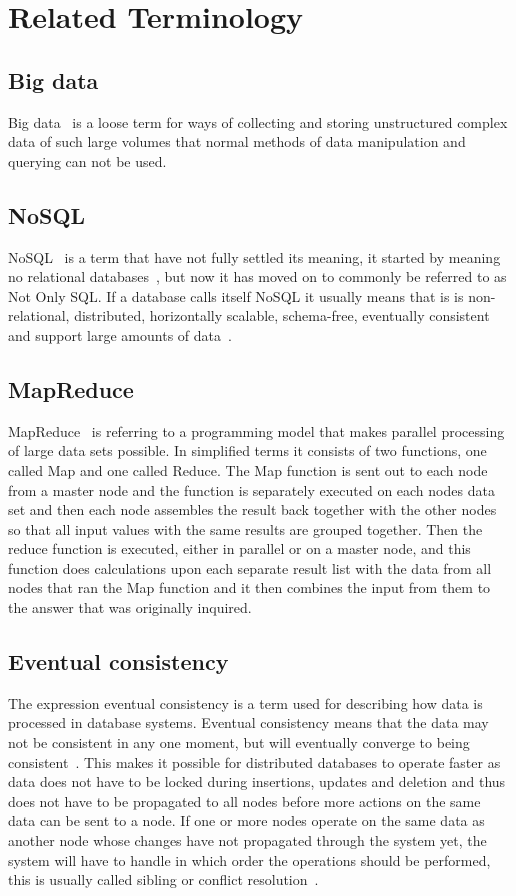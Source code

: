 \documentclass[a4paper,12pt]{article}
\begin{document}
\newpage
\section{Related Terminology}

\subsection{Big data}
Big data~\cite{BD1} is a loose term for ways of collecting and storing unstructured complex data of such large volumes that normal methods of data manipulation and querying can not be used.

\subsection{NoSQL}
NoSQL~\cite{NOSQL} is a term that have not fully settled its meaning, it started by meaning no relational databases~\cite{NOSQL}, but now it has moved on to commonly be referred to as Not Only SQL. 
If a database calls itself NoSQL it usually means that is is non-relational, distributed, horizontally scalable, schema-free, eventually consistent and support large amounts of data~\cite{NOSQL2}.

\subsection{MapReduce}
MapReduce~\cite{G1} is referring to a programming model that makes parallel processing of large data sets possible. In simplified terms it consists of two functions, one called Map and one called Reduce.
The Map function is sent out to each node from a master node and the function is separately executed on each nodes data set and then each node assembles the result back together with the other nodes so that all 
input values with the same results are grouped together. Then the reduce function is executed, either in parallel or on a master node, and this function does calculations upon each separate result list with the data from all nodes that 
ran the Map function and it then combines the input from them to the answer that was originally inquired.

\subsection{Eventual consistency}
The expression eventual consistency is a term used for describing how data is processed in database systems. Eventual consistency means that the data may not be consistent in any one moment, 
but will eventually converge to being consistent~\cite{EVENTUAL}. This makes it possible for distributed databases to operate faster as data does not have to be locked during insertions, updates 
and deletion and thus does not have to be propagated to all nodes before more actions on the same data can be sent to a node. If one or more nodes operate on the same data as another node 
whose changes have not propagated through the system yet, the system will have to handle in which order the operations should be performed, this is usually called sibling or conflict resolution~\cite{RESOLUTION}.
\end{document}
